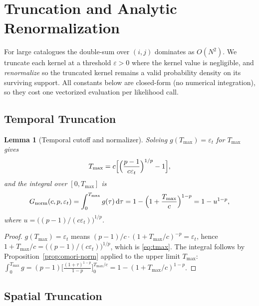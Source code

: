 \documentclass[11pt,a4paper]{article}
\theoremstyle{plain}
\newtheorem{lemma}{Lemma}
\theoremstyle{definition}
\newcommand{\eps}{\varepsilon}
\newcommand{\Gnorm}{G_{\mathrm{norm}}}
\newcommand{\Tmax}{T_{\max}}
\newcommand{\dd}{\mathrm{d}}
\begin{document}
\section{Truncation and Analytic Renormalization}\label{sec:trunc}

For large catalogues the double-sum over $(i,j)$ dominates as $O(N^2)$. We
truncate each kernel at a threshold $\eps>0$ where the kernel value is
negligible, and \emph{renormalize} so the truncated kernel remains a valid
probability density on its surviving support. All constants below are
closed-form (no numerical integration), so they cost one vectorized evaluation
per likelihood call.

\subsection{Temporal Truncation}\label{sec:trunc-t}

\begin{lemma}[Temporal cutoff and normalizer]\label{lem:t-norm}
Solving $g(\Tmax)=\eps_t$ for $\Tmax$ gives
\begin{equation}\label{eq:tmax}
\Tmax = c\Bigl[\Bigl(\frac{p-1}{c\eps_t}\Bigr)^{1/p}-1\Bigr],
\end{equation}
and the integral over $[0,\Tmax]$ is
\begin{equation}\label{eq:gnorm}
\Gnorm(c,p,\eps_t) = \int_0^{\Tmax} g(\tau)\,\dd\tau
= 1-\Bigl(1+\frac{\Tmax}{c}\Bigr)^{1-p} = 1-u^{1-p},
\end{equation}
where $u=\bigl((p-1)/(c\eps_t)\bigr)^{1/p}$.
\end{lemma}
\begin{proof}
$g(\Tmax)=\eps_t$ means $(p-1)/c\cdot(1+\Tmax/c)^{-p}=\eps_t$, hence
$1+\Tmax/c=\bigl((p-1)/(c\eps_t)\bigr)^{1/p}$, which is \eqref{eq:tmax}. The
integral follows by Proposition~\ref{prop:omori-norm} applied to the upper
limit $\Tmax$:
$\int_0^{\Tmax} g = (p-1)\bigl[\tfrac{(1+\tau)^{1-p}}{1-p}\bigr]_0^{\Tmax/c}
= 1-(1+\Tmax/c)^{1-p}$.
\end{proof}

\subsection{Spatial Truncation}\label{sec:trunc-s}
\end{document}

